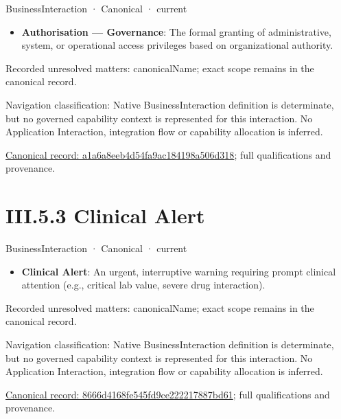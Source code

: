 \label{element:a1a6a8eeb4d54fa9ac184198a506d318}
{\small BusinessInteraction · Canonical · current}\par

\begin{itemize}


\item \textbf{Authorisation — Governance}: The formal granting of administrative, system, or operational access privileges based on organizational authority.

\end{itemize}

{\small Recorded unresolved matters: canonicalName; exact scope remains in the canonical record.}\par
{\small Navigation classification: Native BusinessInteraction definition is determinate, but no governed capability context is represented for this interaction. No Application Interaction, integration flow or capability allocation is inferred.}\par
{\footnotesize \href{../../../../../../../continuum/business/business-interaction/a1a6a8eeb4d54fa9ac184198a506d318.md}{Canonical record: a1a6a8eeb4d54fa9ac184198a506d318}; full qualifications and provenance.}\par
\section*{III.5.3 Clinical Alert}
\label{navigation:III.5.3}

\label{element:8666d4168fe545fd9ce222217887bd61}
{\small BusinessInteraction · Canonical · current}\par

\begin{itemize}


\item \textbf{Clinical Alert}: An urgent, interruptive warning requiring prompt clinical attention (e.g., critical lab value, severe drug interaction).

\end{itemize}

{\small Recorded unresolved matters: canonicalName; exact scope remains in the canonical record.}\par
{\small Navigation classification: Native BusinessInteraction definition is determinate, but no governed capability context is represented for this interaction. No Application Interaction, integration flow or capability allocation is inferred.}\par
{\footnotesize \href{../../../../../../../continuum/business/business-interaction/8666d4168fe545fd9ce222217887bd61.md}{Canonical record: 8666d4168fe545fd9ce222217887bd61}; full qualifications and provenance.}\par
